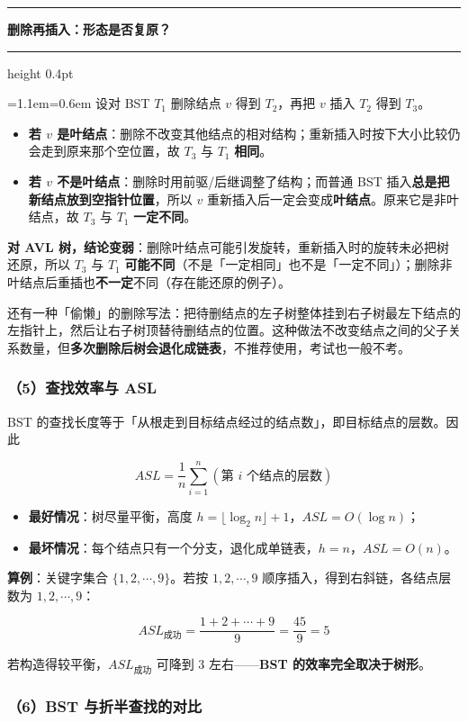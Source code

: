 \documentclass[11pt,openany,UTF8]{ctexbook}
\newcommand{\callouthead}[2]{%
  \par\addvspace{7pt}\noindent
  {\color{#1}\rule[-0.15em]{3pt}{1.05em}}\hspace{0.5em}%
  {\bfseries\color{#1}#2}\par\nobreak\vspace{-0.35em}%
  {\color{rulesep}\hrule height 0.4pt}\nobreak\vspace{0.45em}%
  \begingroup\small\setlength{\parindent}{0pt}%
  \leftskip=1.1em\rightskip=0.6em\noindent\ignorespaces}
\newcommand{\calloutend}{\par\endgroup\addvspace{7pt}}
\newenvironment{callwarn}[1]{\callouthead{warnbar}{#1}}{\calloutend}
\begin{document}
\begin{callwarn}{删除再插入：形态是否复原？}
设对 BST $T_1$ 删除结点 $v$ 得到 $T_2$，再把 $v$ 插入 $T_2$ 得到 $T_3$。

\begin{itemize}
\item \textbf{若 $v$ 是叶结点}：删除不改变其他结点的相对结构；重新插入时按下大小比较仍会走到原来那个空位置，故 $T_3$ 与 $T_1$ \textbf{相同}。
\item \textbf{若 $v$ 不是叶结点}：删除时用前驱/后继调整了结构；而普通 BST 插入\textbf{总是把新结点放到空指针位置}，所以 $v$ 重新插入后一定会变成\textbf{叶结点}。原来它是非叶结点，故 $T_3$ 与 $T_1$ \textbf{一定不同}。
\end{itemize}
\textbf{对 AVL 树，结论变弱}：删除叶结点可能引发旋转，重新插入时的旋转未必把树还原，所以 $T_3$ 与 $T_1$ \textbf{可能不同}（不是「一定相同」也不是「一定不同」）；删除非叶结点后重插也\textbf{不一定}不同（存在能还原的例子）。

\end{callwarn}

还有一种「偷懒」的删除写法：把待删结点的左子树整体挂到右子树最左下结点的左指针上，然后让右子树顶替待删结点的位置。这种做法不改变结点之间的父子关系数量，但\textbf{多次删除后树会退化成链表}，不推荐使用，考试也一般不考。

\subsubsection{（5）查找效率与 ASL}

BST 的查找长度等于「从根走到目标结点经过的结点数」，即目标结点的层数。因此

\[ASL=\frac{1}{n}\sum_{i=1}^{n}(\text{第 }i\text{ 个结点的层数})\]

\begin{itemize}
\item \textbf{最好情况}：树尽量平衡，高度 $h=\lfloor \log_2 n\rfloor+1$，$ASL=O(\log n)$；
\item \textbf{最坏情况}：每个结点只有一个分支，退化成单链表，$h=n$，$ASL=O(n)$。
\end{itemize}
\textbf{算例}：关键字集合 $\{1,2,\cdots,9\}$。若按 $1,2,\cdots,9$ 顺序插入，得到右斜链，各结点层数为 $1,2,\cdots,9$：

\[ASL_{成功}=\frac{1+2+\cdots+9}{9}=\frac{45}{9}=5\]

若构造得较平衡，$ASL_{成功}$ 可降到 3 左右——\textbf{BST 的效率完全取决于树形}。

\subsubsection{（6）BST 与折半查找的对比}
\end{document}

